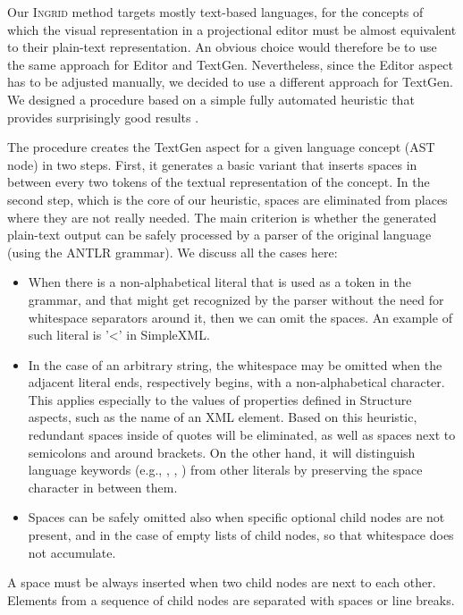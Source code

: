 Our \textsc{Ingrid} method targets mostly text-based languages, for the concepts of which the visual representation in a projectional editor must be almost equivalent to their plain-text representation.
An obvious choice would therefore be to use the same approach for Editor and TextGen.
Nevertheless, since the Editor aspect has to be adjusted manually, we decided to use a different approach for TextGen.
We designed a procedure based on a simple fully automated heuristic that provides surprisingly good results .

The procedure creates the TextGen aspect for a given language concept (AST node) in two steps.
First, it generates a basic variant that inserts spaces in between every two tokens of the textual representation of the concept.
In the second step, which is the core of our heuristic, spaces are eliminated from places where they are not really needed.
The main criterion is whether the generated plain-text output can be safely processed by a parser of the original language (using the ANTLR grammar).
We discuss all the cases here:
\begin{itemize}
	\item When there is a non-alphabetical literal that is used as a token in the grammar, and that might get recognized by the parser without the need for whitespace separators around it, then we can omit the spaces. An example of such literal is '\textless' in SimpleXML.
	\item In the case of an arbitrary string, the whitespace may be omitted when the adjacent literal ends, respectively begins, with a non-alphabetical character.
		This applies especially to the values of properties defined in Structure aspects, such as the name of an XML element.
		Based on this heuristic, redundant spaces inside of quotes will be eliminated, as well as spaces next to semicolons and around brackets.
		On the other hand, it will distinguish language keywords (e.g., , , ) from other literals by preserving the space character in between them.
	\item Spaces can be safely omitted also when specific optional child nodes are not present, and in the case of empty lists of child nodes, so that whitespace does not accumulate.
\end{itemize}
A space must be always inserted when two child nodes are next to each other.
Elements from a sequence of child nodes are separated with spaces or line breaks.

